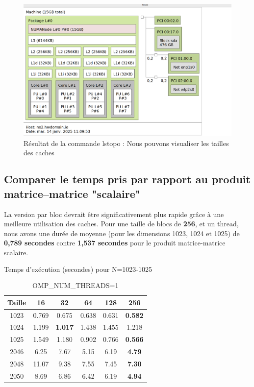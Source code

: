 \documentclass[a4paper,13pt]{book}
\begin{document}
\begin{figure}[!h]
    \begin{center}
        \includegraphics[scale=0.3]{images/lstopo.png}
        \caption{Résultat de la commande lstopo : Nous pouvons visualiser les tailles des caches}
        \label{tab:ls_topo}
    \end{center}
\end{figure}
\clearpage
\subsection{Comparer le temps pris par rapport au produit matrice–matrice "scalaire"}
    La version par bloc devrait être significativement plus rapide grâce à une meilleure utilisation des caches. Pour une taille de blocs de \textbf{256}, et un thread, nous avons une durée de moyenne (pour les dimensions 1023, 1024 et 1025) de \textbf{0,789 secondes}  contre \textbf{1,537 secondes} pour le produit matrice-matrice scalaire.

    \begin{table}
        \centering
        \caption{Temps d'exécution (secondes) pour N=1023-1025}
        \label{tab:small}
        \begin{tabular}{|c|c|c|c|c|c|}\hline
        Taille & 16 & 32 & 64 & 128 & 256 \\\hline
        1023 & 0.769 & 0.675 & 0.638 & 0.631 & \textbf{0.582} \\\hline
        1024 & 1.199 & \textbf{1.017} & 1.438 & 1.455 & 1.218 \\\hline
        1025 & 1.549 & 1.180 & 0.902 & 0.766 & \textbf{0.566} \\\hline
        2046  & 6.25 & 7.67 & 5.15 & 6.19 & \textbf{4.79} \\\hline
        2048 & 11.07 & 9.38 & 7.55 & 7.45 & \textbf{7.30} \\\hline
        2050 &  8.69 & 6.86 & 6.42 & 6.19 & \textbf{4.94} \\\hline
        \end{tabular}
        \caption{OMP\_NUM\_THREADS=1}
        \end{table}
\end{document}
